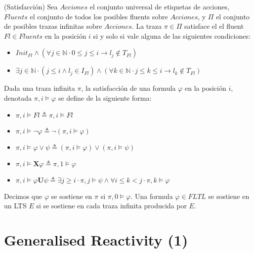 \begin{definition}{(Satisfacción)}
Sea $Acciones$ el conjunto universal de etiquetas de acciones, $Fluents$ el conjunto de todos los posibles fluents sobre $Acciones$,
y $\Pi$ el conjunto de posibles trazas infinitas sobre $Acciones$. La traza $\pi \in \Pi$ satisface el el fluent $Fl \in Fluents$ en
la posición $i$ si y solo si vale alguna de las siguientes condiciones:

\begin{itemize}

\item
$Init_{Fl} \land (\forall j \in \mathbb{N} \cdot 0 \leq j \leq i \rightarrow l_{j} \notin T_{Fl})$

\item
$\exists j \in \mathbb{N} \cdot (j \leq i \land l_{j} \in I_{Fl}) \land (\forall k \in \mathbb{N} \cdot j \leq k \leq i \rightarrow 	l_{k} \notin T_{Fl})$

\end{itemize}

Dada una traza infinita $\pi$, la satisfacción de una formula $\varphi$ en la posición $i$, denotada $\pi, i\vDash \varphi$ se define de la siguiente forma:

\begin{itemize}
\item
$\pi, i\vDash Fl \triangleq \pi, i\vDash Fl$
\item
$\pi, i\vDash \neg\varphi \triangleq \neg(\pi, i\vDash \varphi)$
\item
$\pi, i\vDash \varphi \lor \psi \triangleq (\pi, i\vDash \varphi) \lor (\pi, i\vDash \psi)$
\item
$\pi, i\vDash \textbf{X}\varphi \triangleq \pi, 1\vDash \varphi$
\item
$\pi, i\vDash \varphi\textbf{U}\psi \triangleq \exists j \geq i \cdot \pi, j \vDash \psi \land \forall i \leq k < j \cdot \pi, k \vDash \varphi$
\end{itemize}

Decimos que $\varphi$ se sostiene en $\pi$ si $\pi, 0\vDash \varphi$. Una formula $\varphi \in FLTL$ se sostiene en un LTS $E$ si se sostiene en cada traza
infinita producida por $E$.

\end{definition}


\section{Generalised Reactivity (1)}

